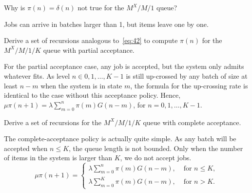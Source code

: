 \begin{exercise}\label{ex:l-154}
 Why is $\pi(n)=\delta(n)$ not true for the $M^X/M/1$  queue?
\begin{solution}
Jobs can arrive in batches larger than 1, but items leave one by one.
\end{solution}
\end{exercise}



\begin{exercise}\label{ex:45}
 Derive a set of recursions analogous to~\cref{eq:42} to compute $\pi(n)$ for the $M^X/M/1/K$ queue with partial acceptance.
\begin{solution}
  For the partial acceptance case, any job is accepted, but the system only admits whatever fits.
  As level $n\in {0,1,\ldots,K-1}$ is still up-crossed by any batch of size at least $n-m$ when the system is in state $m$, the formula for the up-crossing rate is identical to the case without this acceptance policy.
  Hence, $\mu \pi(n+1) = \lambda \sum_{m=0}^n \pi(m) G(n-m)$, for $n=0,1,\ldots, K-1$. 
\end{solution}
\end{exercise}

\begin{exercise}\label{ex:9}
 Derive a set of recursions for the $M^X/M/1/K$ queue with complete acceptance.
\begin{solution}
 The complete-acceptance policy is actually quite simple. As any
 batch will be accepted when $n\leq K$, the queue length is not
 bounded. Only when the number of items in the system is larger than
 $K$, we do not accept jobs. 
 \begin{equation*}
 \mu \pi(n+1) = 
 \begin{cases}
 \lambda \sum_{m=0}^n \pi(m) G(n-m), & \text{ for } n\leq K,\\
 \lambda \sum_{m=0}^K \pi(m) G(n-m), & \text{ for } n> K.
 \end{cases}
 \end{equation*}
\end{solution}
\end{exercise}



